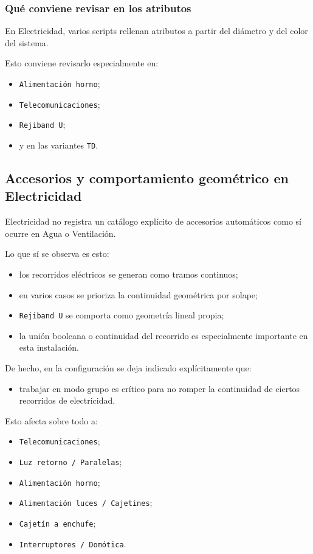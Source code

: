 \subsubsection{Qué conviene revisar en los atributos}

En Electricidad, varios scripts rellenan atributos a partir del diámetro y del color del sistema.

Esto conviene revisarlo especialmente en:

\begin{itemize}
\item \texttt{Alimentación horno};
\item \texttt{Telecomunicaciones};
\item \texttt{Rejiband U};
\item y en las variantes \texttt{TD}.
\end{itemize}

\subsection{Accesorios y comportamiento geométrico en Electricidad}

Electricidad no registra un catálogo explícito de accesorios automáticos como sí ocurre en Agua o Ventilación.

Lo que sí se observa es esto:

\begin{itemize}
\item los recorridos eléctricos se generan como tramos continuos;
\item en varios casos se prioriza la continuidad geométrica por solape;
\item \texttt{Rejiband U} se comporta como geometría lineal propia;
\item la unión booleana o continuidad del recorrido es especialmente importante en esta instalación.
\end{itemize}

De hecho, en la configuración se deja indicado explícitamente que:

\begin{itemize}
\item trabajar en modo grupo es crítico para no romper la continuidad de ciertos recorridos de electricidad.
\end{itemize}

Esto afecta sobre todo a:

\begin{itemize}
\item \texttt{Telecomunicaciones};
\item \texttt{Luz retorno / Paralelas};
\item \texttt{Alimentación horno};
\item \texttt{Alimentación luces / Cajetines};
\item \texttt{Cajetín a enchufe};
\item \texttt{Interruptores / Domótica}.
\end{itemize}

